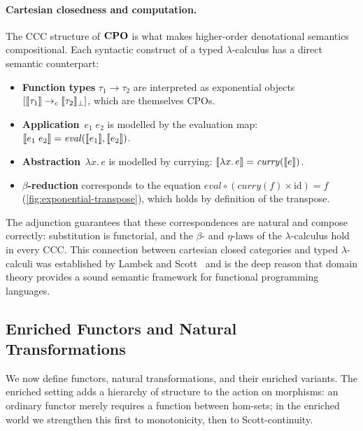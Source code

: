 \paragraph{Cartesian closedness and computation.}
The CCC structure of $\mathbf{CPO}$ is what makes higher-order denotational
semantics compositional.  Each syntactic construct of a typed
$\lambda$-calculus has a direct semantic counterpart:
\begin{itemize}
  \item \textbf{Function types} $\tau_1 \to \tau_2$ are interpreted as
        exponential objects $[\llbracket \tau_1 \rrbracket \to_c \llbracket \tau_2 \rrbracket_\bot]$,
        which are themselves CPOs.
  \item \textbf{Application}~$e_1\;e_2$ is modelled by the evaluation
        map: $\llbracket e_1\;e_2 \rrbracket = \mathit{eval}(\llbracket e_1 \rrbracket, \llbracket e_2 \rrbracket)$.
  \item \textbf{Abstraction}~$\lambda x.\, e$ is modelled by currying:
        $\llbracket \lambda x.\, e \rrbracket = \mathit{curry}(\llbracket e \rrbracket)$.
  \item \textbf{$\beta$-reduction} corresponds to the equation
        $\mathit{eval} \circ (\mathit{curry}(f) \times \mathrm{id}) = f$
        (\cref{fig:exponential-transpose}), which holds by definition
        of the transpose.
\end{itemize}
The adjunction guarantees that these correspondences are natural and
compose correctly: substitution is functorial, and the
$\beta$- and $\eta$-laws of the $\lambda$-calculus hold in every CCC.
This connection between cartesian closed categories and typed
$\lambda$-calculi was established by Lambek and
Scott~\cite{LambekScott1986} and is the deep reason that domain theory
provides a sound semantic framework for functional programming
languages.

\subsection{Enriched Functors and Natural Transformations}
\label{sec:bg-enriched-functors}

We now define functors, natural transformations, and their enriched
variants. The enriched setting adds a hierarchy of structure to the
action on morphisms: an ordinary functor merely requires a function
between hom-sets; in the enriched world we strengthen this first to
monotonicity, then to Scott-continuity.

